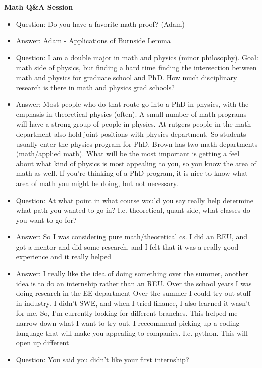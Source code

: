 \documentclass[10pt]{article}
\theoremstyle{definition}
\begin{document}
\begin{center}
  {\bf Math Q\&A Session}
\end{center}
\begin{itemize}
  \item Question: Do you have a favorite math proof? (Adam)
  \item Answer: Adam - Applications of Burnside Lemma
  \item Question: I am a double major in math and physics (minor
    philosophy). Goal: math side of physics, but finding a hard
    time finding the intersection between math and physics for
    graduate school and PhD. How much disciplinary research is
    there in math and physics grad schools?
  \item Answer: Most people who do that route go into a PhD in
    physics, with the emphasis in theoretical physics (often). A
    small number of math programs will have a strong group of
    people in physics. At rutgers people in the math department
    also hold joint positions with physics department. So students
    usually enter the physics program for PhD. Brown has two math
    departments (math/applied math). What will be the most
    important is getting a feel about what kind of physics is most
    appealing to you, so you know the area of math as well. If
    you're thinking of a PhD program, it is nice to know what area
    of math you might be doing, but not necessary.
  \item Question: At what point in what course would you say
    really help determine what path you wanted to go in?
    I.e. theoretical, quant side, what classes do you want to go
    for?
  \item Answer: So I was considering pure math/theoretical cs. I
    did an REU, and got a mentor and did some research, and I felt
    that it was a really good experience and it really helped
  \item Answer: I really like the idea of doing something over the
    summer, another idea is to do an internship rather than an
    REU. Over the school years I was doing research in the EE
    department Over the summer I could try out stuff in
    industry. I didn't SWE, and when I tried finance, I also
    learned it wasn't for me. So, I'm currently looking for
    different branches. This helped me narrow down what I want to
    try out. I reccommend picking up a coding language that will
    make you appealing to companies. I.e. python. This will open
    up different
  \item Question: You said you didn't like your first internship?

\end{itemize}
\end{document}
